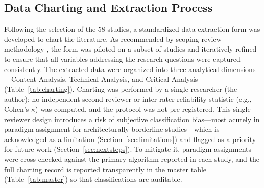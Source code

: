 \documentclass[10pt,letterpaper]{article}
\begin{document}
\begin{figure}[H]
\end{figure}

\subsection{Data Charting and Extraction Process}

Following the selection of the 58 studies, a standardized data-extraction form was developed to chart the literature. As recommended by scoping-review methodology \cite{tricco2018}, the form was piloted on a subset of studies and iteratively refined to ensure that all variables addressing the research questions were captured consistently. The extracted data were organized into three analytical dimensions---Content Analysis, Technical Analysis, and Critical Analysis (Table~\ref{tab:charting}). Charting was performed by a single researcher (the author); no independent second reviewer or inter-rater reliability statistic (e.g., Cohen's $\kappa$) was computed, and the protocol was not pre-registered. This single-reviewer design introduces a risk of subjective classification bias---most acutely in paradigm assignment for architecturally borderline studies---which is acknowledged as a limitation (Section~\ref{sec:limitations}) and flagged as a priority for future work (Section~\ref{sec:nextsteps}). To mitigate it, paradigm assignments were cross-checked against the primary algorithm reported in each study, and the full charting record is reported transparently in the master table (Table~\ref{tab:master}) so that classifications are auditable.
\end{document}

